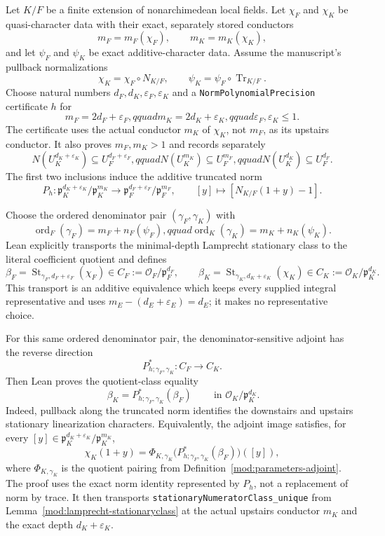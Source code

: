 \begin{corollary}\label{mod:parameters-stationaryclassundernorm}
Let $K/F$ be a finite extension of nonarchimedean local fields.  Let
$\chi_F$ and $\chi_K$ be quasi-character data with their exact, separately
stored conductors
\[
 m_F=m_F(\chi_F),\qquad m_K=m_K(\chi_K),
\]
and let $\psi_F$ and $\psi_K$ be exact additive-character data.  Assume the
manuscript's pullback normalizations
\[
 \chi_K=\chi_F\circ N_{K/F},\qquad
 \psi_K=\psi_F\circ\operatorname{Tr}_{K/F}.
\]
Choose natural numbers $d_F,d_K,\varepsilon_F,\varepsilon_K$ and a
\texttt{NormPolynomialPrecision} certificate $h$ for
\[
 m_F=2d_F+\varepsilon_F,qquad
 m_K=2d_K+\varepsilon_K,qquad
 \varepsilon_F,\varepsilon_K\leq1.
\]
The certificate uses the actual conductor $m_K$ of $\chi_K$, not $m_F$, as
its upstairs conductor.  It also proves $m_F,m_K>1$ and records separately
\[
 N(U_K^{d_K+\varepsilon_K})\subseteq U_F^{d_F+\varepsilon_F},qquad
 N(U_K^{m_K})\subseteq U_F^{m_F},qquad
 N(U_K^{d_K})\subseteq U_F^{d_F}.
\]
The first two inclusions induce the additive truncated norm
\[
 P_h:\mathfrak p_K^{d_K+\varepsilon_K}/\mathfrak p_K^{m_K}
 \longrightarrow
 \mathfrak p_F^{d_F+\varepsilon_F}/\mathfrak p_F^{m_F},
 \qquad [y]\longmapsto[N_{K/F}(1+y)-1].
\]

Choose the ordered denominator pair $(\gamma_F,\gamma_K)$ with
\[
 \operatorname{ord}_F(\gamma_F)=m_F+n_F(\psi_F),qquad
 \operatorname{ord}_K(\gamma_K)=m_K+n_K(\psi_K).
\]
Lean explicitly transports the minimal-depth Lamprecht stationary class to
the literal coefficient quotient and defines
\[
 \beta_F=\operatorname{St}_{\gamma_F,d_F+\varepsilon_F}(\chi_F)
   \in C_F:=\mathcal O_F/\mathfrak p_F^{d_F},
 \qquad
 \beta_K=\operatorname{St}_{\gamma_K,d_K+\varepsilon_K}(\chi_K)
   \in C_K:=\mathcal O_K/\mathfrak p_K^{d_K}.
\]
This transport is an additive equivalence which keeps every supplied
integral representative and uses
$m_E-(d_E+\varepsilon_E)=d_E$; it makes no representative choice.

For this same ordered denominator pair, the denominator-sensitive adjoint has
the reverse direction
\[
 P^*_{h;\gamma_F,\gamma_K}:C_F\longrightarrow C_K.
\]
Then Lean proves the quotient-class equality
\[
 \boxed{\ \beta_K=P^*_{h;\gamma_F,\gamma_K}(\beta_F)\ }
 \qquad\text{in }\mathcal O_K/\mathfrak p_K^{d_K}.
\]
Indeed, pullback along the truncated norm identifies the downstairs and
upstairs stationary linearization characters.  Equivalently, the adjoint
image satisfies, for every
$[y]\in\mathfrak p_K^{d_K+\varepsilon_K}/\mathfrak p_K^{m_K}$,
\[
 \chi_K(1+y)=
 \Phi_{K,\gamma_K}
   \bigl(P^*_{h;\gamma_F,\gamma_K}(\beta_F)\bigr)([y]),
\]
where $\Phi_{K,\gamma_K}$ is the quotient pairing from
Definition~\ref{mod:parameters-adjoint}.
The proof uses the exact norm identity represented by $P_h$, not a replacement
of norm by trace.  It then transports
\texttt{stationaryNumeratorClass\_unique} from
Lemma~\ref{mod:lamprecht-stationaryclass} at the actual upstairs conductor
$m_K$ and the exact depth $d_K+\varepsilon_K$.


\end{corollary}
